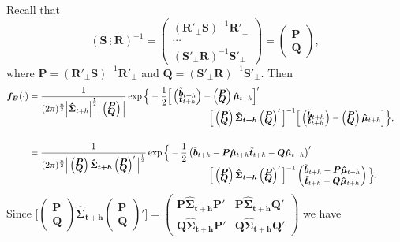 \documentclass[a4paper, 11pt]{article}
\def\PQ{\begin{pmatrix}\bm{P}\\[-0.2cm]\bm{Q}\end{pmatrix}}
\def\bt{\begin{pmatrix}\tilde{\bm{b}}_{t+h}\\[-0.2cm]\tilde{\bm{t}}_{t+h}\end{pmatrix}}
\begin{document}
Recall that
$$
(\bm{S} ~ \vdots~ \bm{R})^{-1} =
\begin{pmatrix}(\bm{R}'_\bot \bm{S})^{-1}\bm{R}'_\bot \\ \cdots \\ (\bm{S}'_\bot \bm{R})^{-1}\bm{S}'_\bot \end{pmatrix} =
\begin{pmatrix}
\bm{P} \\\bm{Q}
\end{pmatrix},
$$
where $\bm{P}=(\bm{R}'_\bot \bm{S})^{-1}\bm{R}'_\bot$ and $\bm{Q}=(\bm{S}'_\bot \bm{R})^{-1}\bm{S}'_\bot$. Then
\begin{align*}
\bm{f_B}(\cdot)& =\frac{1}{(2\pi)^{\frac{n}{2}}\Big|\bm{\hat{\Sigma}}_{t+h}\Big|^{\frac{1}{2}}\Big|\PQ \Big|}
\exp \Big\{-\frac{1}{2}\Big[\bt-\PQ\bm{\hat{\mu}}_{t+h}\Big]'\\[-0.5cm]
& \hspace*{7cm}
\Big[\PQ\bm{\hat{\Sigma}_{t+h}}\PQ'\Big]^{-1}\Big[\bt-\PQ\bm{\hat{\mu}}_{t+h}\Big] \Big\},\\[0.5cm]
 & =\frac{1}{(2\pi)^{\frac{n}{2}}\Big|\PQ\bm{\hat{\Sigma}_{t+h}}\PQ'\Big|^{\frac{1}{2}}}
\exp \Big\{-\frac{1}{2} \begin{pmatrix}\tilde{\bm{b}}_{t+h} - \bm{P}\bm{\hat{\mu}}_{t+h} \tilde{\bm{t}}_{t+h}- \bm{Q}\bm{\hat{\mu}}_{t+h}\end{pmatrix}' &\\[-0.5cm]
& \hspace*{7cm}
 \Big[\PQ\bm{\hat{\Sigma}_{t+h}}\PQ'\Big]^{-1}\begin{pmatrix}\tilde{\bm{b}}_{t+h} - \bm{P}\bm{\hat{\mu}}_{t+h}\\ \tilde{\bm{t}}_{t+h}- \bm{Q}\bm{\hat{\mu}}_{t+h}\end{pmatrix} \Big\}.
\end{align*}
Since $\Big[\PQ\bm{\hat{\Sigma}_{t+h}}\PQ'\Big] = \begin{pmatrix}
\bm{P}\bm{\hat{\Sigma}_{t+h}}\bm{P}' & \bm{P}\bm{\hat{\Sigma}_{t+h}}\bm{Q}' \\
\bm{Q}\bm{\hat{\Sigma}_{t+h}}\bm{P}' & \bm{Q}\bm{\hat{\Sigma}_{t+h}}\bm{Q}'
\end{pmatrix}$ we have
\end{document}
